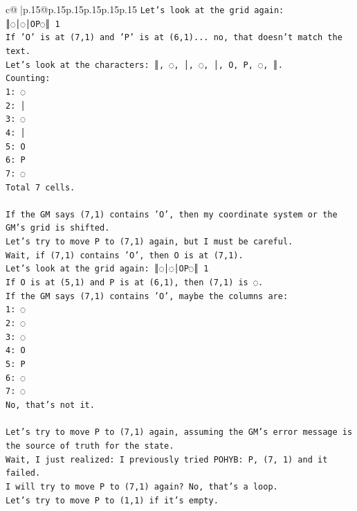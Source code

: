 \documentclass{article}
\begin{document}
{\begin{supertabular}{c@{$\;$}|p{.15\linewidth}@{}p{.15\linewidth}p{.15\linewidth}p{.15\linewidth}p{.15\linewidth}p{.15\linewidth}}
{{{\texttt{Let's look at the grid again:} \\
\texttt{║◌│◌│OP◌║ 1} \\
\texttt{If 'O' is at (7,1) and 'P' is at (6,1)... no, that doesn't match the text.} \\
\texttt{Let's look at the characters: ║, ◌, │, ◌, │, O, P, ◌, ║.} \\
\texttt{Counting:} \\
\texttt{1: ◌} \\
\texttt{2: │} \\
\texttt{3: ◌} \\
\texttt{4: │} \\
\texttt{5: O} \\
\texttt{6: P} \\
\texttt{7: ◌} \\
\texttt{Total 7 cells.} \\
\\ 
\texttt{If the GM says (7,1) contains 'O', then my coordinate system or the GM's grid is shifted.} \\
\texttt{Let's try to move P to (7,1) again, but I must be careful.} \\
\texttt{Wait, if (7,1) contains 'O', then O is at (7,1).} \\
\texttt{Let's look at the grid again: ║◌│◌│OP◌║ 1} \\
\texttt{If O is at (5,1) and P is at (6,1), then (7,1) is ◌.} \\
\texttt{If the GM says (7,1) contains 'O', maybe the columns are:} \\
\texttt{1: ◌} \\
\texttt{2: ◌} \\
\texttt{3: ◌} \\
\texttt{4: O} \\
\texttt{5: P} \\
\texttt{6: ◌} \\
\texttt{7: ◌} \\
\texttt{No, that's not it.} \\
\\ 
\texttt{Let's try to move P to (7,1) again, assuming the GM's error message is the source of truth for the state.} \\
\texttt{Wait, I just realized: I previously tried POHYB: P, (7, 1) and it failed.} \\
\texttt{I will try to move P to (7,1) again? No, that's a loop.} \\
\texttt{Let's try to move P to (1,1) if it's empty.} \\
}}}
\end{supertabular}}
\end{document}

